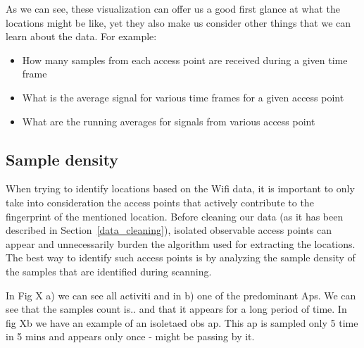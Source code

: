 As we can see, these visualization can offer us a good first glance at what the
locations might be like, yet they also make us consider other things that we can
learn about the data. For example:
\begin{itemize}
  \item How many samples from each access point are received during a given time
  frame
  \item What is the average signal for various time frames for a given access
  point
  \item What are the running averages for signals from various access point
\end{itemize}

\subsection{Sample density}

When trying to identify locations based on the Wifi data, it is important to
only take into consideration the access points that actively contribute to the
fingerprint of the mentioned location. Before cleaning our data (as it has been
described in Section~\ref{data_cleaning}), isolated observable access points can
appear and unnecessarily burden the algorithm used for extracting the locations.
The best way to identify such access points is by analyzing the sample density
of the samples that are identified during scanning.

In Fig X a) we can see all activiti and in b) one of the predominant Aps. We can
see that the samples count is.. and that it appears for a long period of time.
In fig Xb we have an example of an isoletaed obs ap. This ap is sampled only 5
time in 5 mins and appears only once - might be passing by it.

